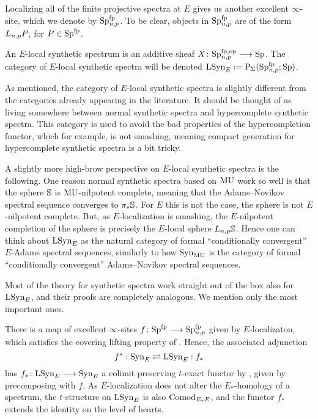 Localizing all of the finite projective spectra at $E$ gives us another excellent $\infty$-site, which we denote by $\Sp\np\fp$. To be clear, objects in $\Sp\np\fp$ are of the form $L\np P$, for $P\in \Sp\fp$. 

\begin{definition}
    An $E$-local synthetic spectrum is an additive sheaf $X\: \Sp\np^{\mathrm{fp}, \mathrm{op}}\to \Sp$. The category of $E$-local synthetic spectra will be denoted $\LSynE := \mathrm{P}_\Sigma(\Sp\np\fp;\Sp)$. 
\end{definition}

\begin{remark}
    As mentioned, the category of $E$-local synthetic spectra is slightly different from the categories already appearing in the literature. It should be thought of as living somewhere between normal synthetic spectra and hypercomplete synthetic spectra. This category is used to avoid the bad properties of the hypercompletion functor, which for example, is not smashing, meaning compact generation for hypercomplete synthetic spectra is a bit tricky. 
\end{remark}

\begin{remark}
    A slightly more high-brow perspective on $E$-local synthetic spectra is the following. One reason normal synthetic spectra based on $\MU$ work so well is that the sphere $\S$ is $\MU$-nilpotent complete, meaning that the Adams--Novikov spectral sequence converges to $\pi_*\S$. For $E$ this is not the case, the sphere is not $E$-nilpotent complete. But, as $E$-localization is smashing, the $E$-nilpotent completion of the sphere is precisely the $E$-local sphere $L\np \S$. Hence one can think about $\LSynE$ as the natural category of formal ``conditionally convergent'' $E$-Adams spectral sequences, similarly to how $\Syn_\MU$ is the category of formal ``conditionally convergent'' Adams--Novikov spectral sequences. 
\end{remark}

Most of the theory for synthetic spectra work straight out of the box also for $\LSynE$, and their proofs are completely analogous. We mention only the most important ones.  

There is a map of excellent $\infty$-sites $f\: \Sp\fp\to \Sp\np\fp$ given by $E$-localizaton, which satisfies the covering lifting property of \cite[A.12]{pstragowski_2022}. Hence, the associated adjunction 
\[f^*:\SynE \rightleftarrows \LSynE:f_*\]
has $f_* \: \LSynE \to \SynE$ a colimit preserving $t$-exact functor by \cite[2.22, 2.23]{pstragowski_2022}, given by precomposing with $f$. As $E$-localization does not alter the $E_*$-homology of a spectrum, the $t$-structure on $\LSynE$ is also $\ComodE$, and the functor $f_*$ extends the identity on the level of hearts. 

